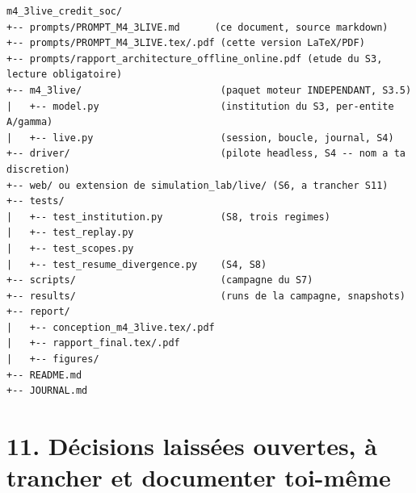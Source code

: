 \documentclass[11pt,a4paper]{article}
\begin{document}
\begin{verbatim}
m4_3live_credit_soc/
+-- prompts/PROMPT_M4_3LIVE.md      (ce document, source markdown)
+-- prompts/PROMPT_M4_3LIVE.tex/.pdf (cette version LaTeX/PDF)
+-- prompts/rapport_architecture_offline_online.pdf (etude du S3, lecture obligatoire)
+-- m4_3live/                        (paquet moteur INDEPENDANT, S3.5)
|   +-- model.py                     (institution du S3, per-entite A/gamma)
|   +-- live.py                      (session, boucle, journal, S4)
+-- driver/                          (pilote headless, S4 -- nom a ta discretion)
+-- web/ ou extension de simulation_lab/live/ (S6, a trancher S11)
+-- tests/
|   +-- test_institution.py          (S8, trois regimes)
|   +-- test_replay.py
|   +-- test_scopes.py
|   +-- test_resume_divergence.py    (S4, S8)
+-- scripts/                         (campagne du S7)
+-- results/                         (runs de la campagne, snapshots)
+-- report/
|   +-- conception_m4_3live.tex/.pdf
|   +-- rapport_final.tex/.pdf
|   +-- figures/
+-- README.md
+-- JOURNAL.md
\end{verbatim}

\section*{11. Décisions laissées ouvertes, à trancher et documenter toi-même}
\end{document}
